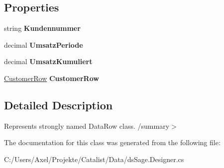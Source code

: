 \subsection*{Properties}
\begin{DoxyCompactItemize}
\item 
string {\bfseries Kundennummer}\hypertarget{class_products_1_1_data_1_1ds_sage_1_1_customer_sales_row_aa5b712de15790a6bc171f575b1003902}{}\label{class_products_1_1_data_1_1ds_sage_1_1_customer_sales_row_aa5b712de15790a6bc171f575b1003902}

\item 
decimal {\bfseries Umsatz\+Periode}\hypertarget{class_products_1_1_data_1_1ds_sage_1_1_customer_sales_row_a5a2ddceb5c12aa1ad2d1a7ceb2cea22f}{}\label{class_products_1_1_data_1_1ds_sage_1_1_customer_sales_row_a5a2ddceb5c12aa1ad2d1a7ceb2cea22f}

\item 
decimal {\bfseries Umsatz\+Kumuliert}\hypertarget{class_products_1_1_data_1_1ds_sage_1_1_customer_sales_row_afabc48924454412e67837521a6a185a4}{}\label{class_products_1_1_data_1_1ds_sage_1_1_customer_sales_row_afabc48924454412e67837521a6a185a4}

\item 
\hyperlink{class_products_1_1_data_1_1ds_sage_1_1_customer_row}{Customer\+Row} {\bfseries Customer\+Row}\hypertarget{class_products_1_1_data_1_1ds_sage_1_1_customer_sales_row_afad437c4cf510ee4f38b74987b7b9b60}{}\label{class_products_1_1_data_1_1ds_sage_1_1_customer_sales_row_afad437c4cf510ee4f38b74987b7b9b60}

\end{DoxyCompactItemize}


\subsection{Detailed Description}
Represents strongly named Data\+Row class. /summary$>$ 

The documentation for this class was generated from the following file\+:\begin{DoxyCompactItemize}
\item 
C\+:/\+Users/\+Axel/\+Projekte/\+Catalist/\+Data/ds\+Sage.\+Designer.\+cs\end{DoxyCompactItemize}
